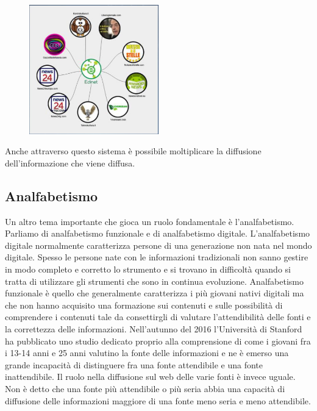 \begin{figure}[h]
    \centering
    \includegraphics[width=0.5\textwidth]{images/10_lez_fig_01.jpg}
\end{figure}


Anche attraverso questo sistema è possibile moltiplicare la diffusione dell'informazione che viene diffusa. 

\subsection{Analfabetismo}
Un altro tema importante che gioca un ruolo fondamentale è l'analfabetismo. Parliamo di analfabetismo funzionale e di analfabetismo digitale. 
L'analfabetismo digitale normalmente caratterizza persone di una generazione non nata nel mondo digitale. Spesso le persone nate con le informazioni tradizionali non sanno gestire in modo completo e corretto lo strumento e si trovano in difficoltà quando si tratta di utilizzare gli strumenti che sono in continua evoluzione. 
Analfabetismo funzionale è quello che generalmente caratterizza i più giovani nativi digitali ma che non hanno acquisito una formazione sui contenuti e sulle possibilità di comprendere i contenuti tale da consettirgli di valutare l'attendibilità delle fonti e la correttezza delle informazioni.
Nell'autunno del 2016 l'Università di Stanford ha pubblicato uno studio dedicato proprio alla comprensione di come i giovani fra i 13-14 anni e 25 anni valutino la fonte delle informazioni e ne è emerso una grande incapacità di distinguere fra una fonte attendibile e una fonte inattendibile. 
Il ruolo nella diffusione sul web delle varie fonti è invece uguale. Non è detto che una fonte più attendibile o più seria abbia una capacità di diffusione delle informazioni maggiore di una fonte meno seria e meno attendibile. 
